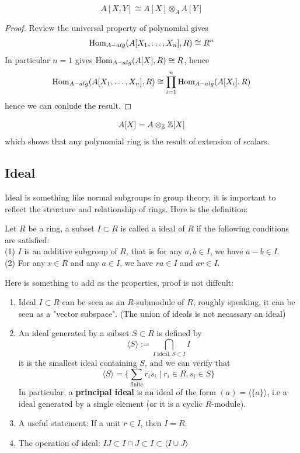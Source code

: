 \documentclass[12pt,a4paper]{article}
\begin{document}
\begin{claim}
    \[A[X,Y] \cong A[X] \otimes_A A[Y]\]
\end{claim}
\begin{proof}
    Review the universal property of polynomial gives
    \[\operatorname{Hom}_{A-alg}(A[X_1,\dots,X_n],R) \cong R^n\]
    In particular \(n=1\) gives \(\operatorname{Hom}_{A-alg}(A[X],R) \cong R\), hence 
    \[\operatorname{Hom}_{A-alg}(A[X_1,\dots,X_n],R) \cong \prod_{i=1}^n \operatorname{Hom}_{A-alg}(A[X_i],R)\]
    hence we can conlude the result.
\end{proof}
\begin{claim}
    \[A[X] = A \otimes_{\mathbb{Z}} \mathbb{Z}[X] \]
    which shows that any polynomial ring is the result of extension of scalars.
\end{claim}




\subsection{Ideal}
Ideal is something like normal subgroups in group theory, it is important to reflect the structure and relationship of rings. Here is the definition:
\begin{definition}
    Let \(R\) be a ring, a subset \(I \subset R\) is called a ideal of \(R\) if the following conditions are satisfied:\\
    (1) \(I\) is an additive subgroup of \(R\), that is for any \(a,b \in I\), we have \(a-b \in I\).\\
    (2) For any \(r \in R\) and any \(a \in I\), we have \(ra \in I\) and \(ar \in I\).
\end{definition}

    Here is something to add as the properties, proof is not diffcult: 
    \begin{enumerate}
        \item Ideal \(I \subset R\) can be seen as an \(R\)-submodule of \(R\), roughly speaking, it can be seen as a "vector subspace". (The union of ideals is not necassary an ideal)

        \item An ideal generated by a subset \(S \subset R\) is defined by 
    \[\langle S \rangle := \bigcap_{I \text{ ideal}, S \subset I} I\]
    it is the smallest ideal containing \(S\), and we can verify that
    \[\langle S \rangle = \{\sum_{\text{finite}} r_i s_i \mid r_i \in R, s_i \in S\}\]
    In particular, a \textbf{principal ideal} is an ideal of the form \((a) = \langle \{a\} \rangle\), i.e a ideal generated by a single element (or it is a cyclic \(R\)-module).

        \item A useful statement: If a unit \(r \in I\), then \(I = R\).

        \item The operation of ideal: \(IJ \subset I\cap J \subset I \subset \langle I\cup J \rangle\)
    \end{enumerate}
\end{document}
